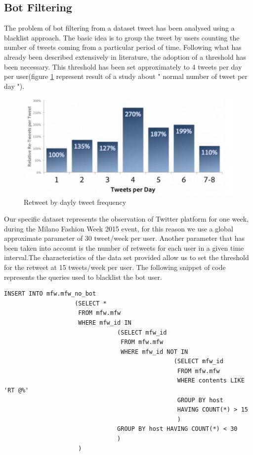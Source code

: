 \documentclass[conference, onecolumn]{IEEEtran}
\begin{document}
\subsection{Bot Filtering}
\medskip
The problem of bot filtering from a dataset tweet has been analysed using a blacklist approach. The basic idea is to group the tweet by users counting the number of tweets coming from a particular period of time. Following what has already been described extensively in literature, the adoption of a threshold has been necessary. This threshold has been set approximately to 4 tweets per day per user(figure \ref{fig:tweeDay} represent result of a study about " normal number of tweet per day ").
\begin{figure} [!htbp]
	\centering
	\vspace{0.3cm}
	\includegraphics[scale=0.7]{images/daytweet}
	\caption{Retweet by dayly tweet frequency}
	\vspace{0.3cm}
	\label{fig:tweeDay}
\end{figure}
Our specific dataset represents the observation of Twitter platform for one week, during the Milano Fashion Week 2015 event, for this reason we use a global approximate parameter of 30 tweet/week per user. Another parameter that has been taken into account is the number of retweets for each user in a given time interval.The characteristics of the data set provided allow us to set the threshold for the retweet at 15 tweets/week per user.
\newpage
The following snippet of code represents the queries used to blacklist the bot user.
\begin{lstlisting}
INSERT INTO mfw.mfw_no_bot
					(SELECT * 
					 FROM mfw.mfw 
					 WHERE mfw_id IN
								(SELECT mfw_id
								 FROM mfw.mfw
								 WHERE mfw_id NOT IN
												(SELECT mfw_id
												 FROM mfw.mfw
												 WHERE contents LIKE 'RT @%'
												 GROUP BY host
												 HAVING COUNT(*) > 15
												 )
								GROUP BY host HAVING COUNT(*) < 30
								)
					 )
\end{lstlisting}
\end{document}
